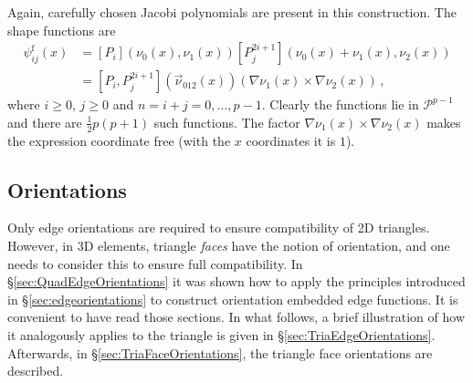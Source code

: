 Again, carefully chosen Jacobi polynomials are present in this construction. 
The shape functions are
\begin{equation}
\begin{aligned}
	\psi_{ij}^\mathrm{f}(x)&=[P_i](\nu_0(x),\nu_1(x))[P_j^{2i+1}](\nu_0(x)+\nu_1(x),\nu_2(x))\\
		&=[P_i,P_j^{2i+1}](\vec{\nu}_{012}(x))(\nabla\nu_1(x)\!\!\times\!\!\nabla\nu_2(x))\,,
\end{aligned}
\end{equation}
where $i\geq0$, $j\geq0$ and $n=i+j=0,\ldots,p-1$.
Clearly the functions lie in $\mathcal{P}^{p-1}$ and there are $\frac{1}{2}p(p+1)$ such functions. 
The factor $\nabla\nu_1(x)\!\times\!\nabla\nu_2(x)$ makes the expression coordinate free (with the $x$ coordinates it is $1$).

%
%

\subsection{Orientations}
\label{sec:TriaOrientations}

Only edge orientations are required to ensure compatibility of 2D triangles.
However, in 3D elements, triangle \textit{faces} have the notion of orientation, and one needs to consider this to ensure full compatibility.
In \S\ref{sec:QuadEdgeOrientations} it was shown how to apply the principles introduced in \S\ref{sec:edgeorientations} to construct orientation embedded edge functions.
It is convenient to have read those sections.
In what follows, a brief illustration of how it analogously applies to the triangle is given in \S\ref{sec:TriaEdgeOrientations}.
Afterwards, in \S\ref{sec:TriaFaceOrientations}, the triangle face orientations are described.

